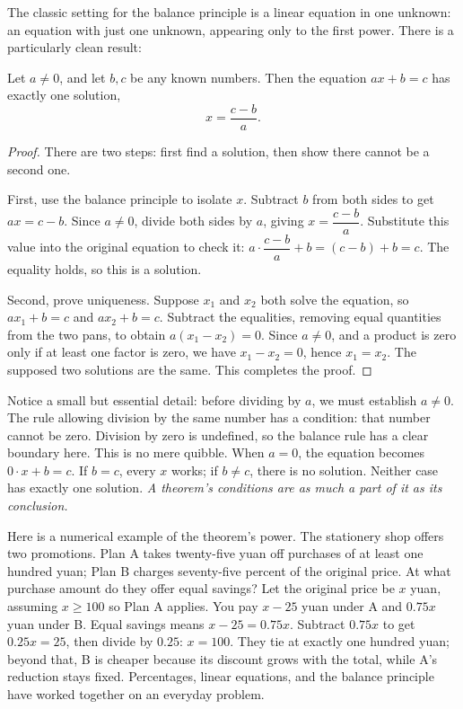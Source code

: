 The classic setting for the balance principle is a linear equation in one unknown: an equation with just one unknown, appearing only to the first power. There is a particularly clean result:

\begin{dingli}
Let $a\neq 0$, and let $b,c$ be any known numbers. Then the equation $ax+b=c$ has exactly one solution,
\[
x=\frac{c-b}{a}.
\]
\end{dingli}

\begin{proof}
There are two steps: first find a solution, then show there cannot be a second one.

First, use the balance principle to isolate $x$. Subtract $b$ from both sides to get $ax=c-b$. Since $a\neq0$, divide both sides by $a$, giving $x=\dfrac{c-b}{a}$. Substitute this value into the original equation to check it: $a\cdot\dfrac{c-b}{a}+b=(c-b)+b=c$. The equality holds, so this is a solution.

Second, prove uniqueness. Suppose $x_1$ and $x_2$ both solve the equation, so $ax_1+b=c$ and $ax_2+b=c$. Subtract the equalities, removing equal quantities from the two pans, to obtain $a(x_1-x_2)=0$. Since $a\neq0$, and a product is zero only if at least one factor is zero, we have $x_1-x_2=0$, hence $x_1=x_2$. The supposed two solutions are the same. This completes the proof.
\end{proof}

Notice a small but essential detail: before dividing by $a$, we must establish $a\neq0$. The rule allowing division by the same number has a condition: that number cannot be zero. Division by zero is undefined, so the balance rule has a clear boundary here. This is no mere quibble. When $a=0$, the equation becomes $0\cdot x+b=c$. If $b=c$, every $x$ works; if $b\neq c$, there is no solution. Neither case has exactly one solution. \emph{A theorem's conditions are as much a part of it as its conclusion.}

Here is a numerical example of the theorem's power. The stationery shop offers two promotions. Plan A takes twenty-five yuan off purchases of at least one hundred yuan; Plan B charges seventy-five percent of the original price. At what purchase amount do they offer equal savings? Let the original price be $x$ yuan, assuming $x\geq100$ so Plan A applies. You pay $x-25$ yuan under A and $0.75x$ yuan under B. Equal savings means $x-25=0.75x$. Subtract $0.75x$ to get $0.25x=25$, then divide by $0.25$: $x=100$. They tie at exactly one hundred yuan; beyond that, B is cheaper because its discount grows with the total, while A's reduction stays fixed. Percentages, linear equations, and the balance principle have worked together on an everyday problem.

